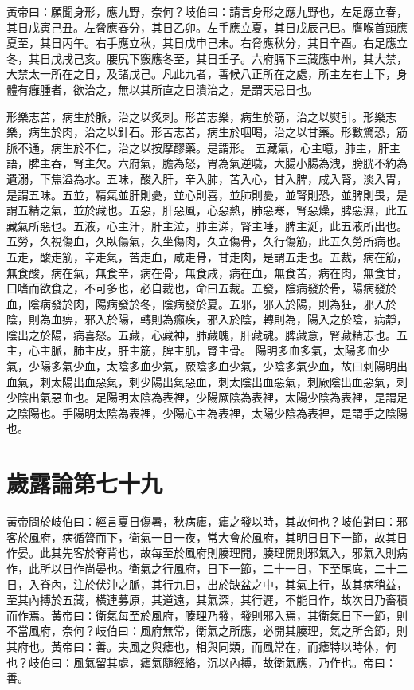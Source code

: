黃帝曰：願聞身形，應九野，奈何？岐伯曰：請言身形之應九野也，左足應立春，其日戊寅己丑。左脅應春分，其日乙卯。左手應立夏，其日戊辰己巳。膺喉首頭應夏至，其日丙午。右手應立秋，其日戊申己未。右脅應秋分，其日辛酉。右足應立冬，其日戊戌己亥。腰尻下竅應冬至，其日壬子。六府膈下三藏應中州，其大禁，大禁太一所在之日，及諸戊己。凡此九者，善候八正所在之處，所主左右上下，身體有癰腫者，欲治之，無以其所直之日潰治之，是謂天忌日也。

形樂志苦，病生於脈，治之以炙刺。形苦志樂，病生於筋，治之以熨引。形樂志樂，病生於肉，治之以針石。形苦志苦，病生於咽喝，治之以甘藥。形數驚恐，筋脈不通，病生於不仁，治之以按摩醪藥。是謂形。
五藏氣，心主噫，肺主，肝主語，脾主吞，腎主欠。六府氣，膽為怒，胃為氣逆噦，大腸小腸為洩，膀胱不約為遺溺，下焦溢為水。五味，酸入肝，辛入肺，苦入心，甘入脾，咸入腎，淡入胃，是謂五味。五並，精氣並肝則憂，並心則喜，並肺則憂，並腎則恐，並脾則畏，是謂五精之氣，並於藏也。五惡，肝惡風，心惡熱，肺惡寒，腎惡燥，脾惡濕，此五藏氣所惡也。五液，心主汗，肝主泣，肺主涕，腎主唾，脾主涎，此五液所出也。五勞，久視傷血，久臥傷氣，久坐傷肉，久立傷骨，久行傷筋，此五久勞所病也。五走，酸走筋，辛走氣，苦走血，咸走骨，甘走肉，是謂五走也。五裁，病在筋，無食酸，病在氣，無食辛，病在骨，無食咸，病在血，無食苦，病在肉，無食甘，口嗜而欲食之，不可多也，必自裁也，命曰五裁。五發，陰病發於骨，陽病發於血，陰病發於肉，陽病發於冬，陰病發於夏。五邪，邪入於陽，則為狂，邪入於陰，則為血痹，邪入於陽，轉則為癲疾，邪入於陰，轉則為，陽入之於陰，病靜，陰出之於陽，病喜怒。五藏，心藏神，肺藏魄，肝藏魂。脾藏意，腎藏精志也。五主，心主脈，肺主皮，肝主筋，脾主肌，腎主骨。
陽明多血多氣，太陽多血少氣，少陽多氣少血，太陰多血少氣，厥陰多血少氣，少陰多氣少血，故曰刺陽明出血氣，刺太陽出血惡氣，刺少陽出氣惡血，刺太陰出血惡氣，刺厥陰出血惡氣，刺少陰出氣惡血也。足陽明太陰為表裡，少陽厥陰為表裡，太陽少陰為表裡，是謂足之陰陽也。手陽明太陰為表裡，少陽心主為表裡，太陽少陰為表裡，是謂手之陰陽也。



\section{歲露論第七十九}

黃帝問於岐伯曰：經言夏日傷暑，秋病瘧，瘧之發以時，其故何也？岐伯對曰：邪客於風府，病循膂而下，衛氣一日一夜，常大會於風府，其明日日下一節，故其日作晏。此其先客於脊背也，故每至於風府則腠理開，腠理開則邪氣入，邪氣入則病作，此所以日作尚晏也。衛氣之行風府，日下一節，二十一日，下至尾底，二十二日，入脊內，注於伏沖之脈，其行九日，出於缺盆之中，其氣上行，故其病稍益，至其內搏於五藏，橫連募原，其道遠，其氣深，其行遲，不能日作，故次日乃畜積而作焉。黃帝曰：衛氣每至於風府，腠理乃發，發則邪入焉，其衛氣日下一節，則不當風府，奈何？岐伯曰：風府無常，衛氣之所應，必開其腠理，氣之所舍節，則其府也。黃帝曰：善。夫風之與瘧也，相與同類，而風常在，而瘧特以時休，何也？岐伯曰：風氣留其處，瘧氣隨經絡，沉以內搏，故衛氣應，乃作也。帝曰：善。

